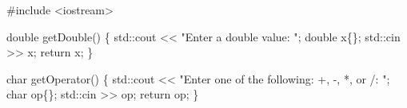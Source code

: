 \documentclass[
  letterpaper,
  DIV=11,
  numbers=noendperiod]{scrreprt}
\newenvironment{Shaded}{\begin{snugshade}}{\end{snugshade}}
\newcommand{\CommentTok}[1]{\textcolor[rgb]{0.37,0.37,0.37}{#1}}
\newcommand{\ErrorTok}[1]{\textcolor[rgb]{0.68,0.00,0.00}{#1}}
\newcommand{\FunctionTok}[1]{\textcolor[rgb]{0.28,0.35,0.67}{#1}}
\newcommand{\NormalTok}[1]{\textcolor[rgb]{0.00,0.23,0.31}{#1}}
\newcommand{\SpecialCharTok}[1]{\textcolor[rgb]{0.37,0.37,0.37}{#1}}
\newcommand{\StringTok}[1]{\textcolor[rgb]{0.13,0.47,0.30}{#1}}
\begin{document}
\begin{Shaded}
\begin{Highlighting}[]
\CommentTok{\#include \textless{}iostream\textgreater{}}

\NormalTok{double }\FunctionTok{getDouble}\NormalTok{()}
\NormalTok{\{}
\NormalTok{    std}\SpecialCharTok{::}\NormalTok{cout }\SpecialCharTok{\textless{}}\ErrorTok{\textless{}} \StringTok{"Enter a double value: "}\NormalTok{;}
\NormalTok{    double x\{\};}
\NormalTok{    std}\SpecialCharTok{::}\NormalTok{cin }\SpecialCharTok{\textgreater{}}\ErrorTok{\textgreater{}}\NormalTok{ x;}
\NormalTok{    return x;}
\NormalTok{\}}

\NormalTok{char }\FunctionTok{getOperator}\NormalTok{()}
\NormalTok{\{}
\NormalTok{    std}\SpecialCharTok{::}\NormalTok{cout }\SpecialCharTok{\textless{}}\ErrorTok{\textless{}} \StringTok{"Enter one of the following: +, {-}, *, or /: "}\NormalTok{;}
\NormalTok{    char op\{\};}
\NormalTok{    std}\SpecialCharTok{::}\NormalTok{cin }\SpecialCharTok{\textgreater{}}\ErrorTok{\textgreater{}}\NormalTok{ op;}
\NormalTok{    return op;}
\NormalTok{\}}


\end{Highlighting}
\end{Shaded}
\end{document}

